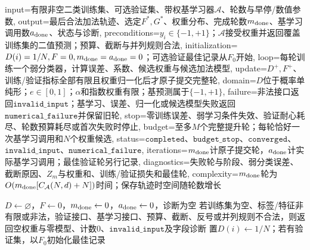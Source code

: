 \begin{AlgorithmContract}{
  input={有限非空二类训练集、可选验证集、带权基学习器$\mathcal A$、轮数与早停/数值参数},
  output={最后合法加法轨迹、选定$F^*,G^*$、权重分布、完成轮数$m_{\rm done}$、基学习调用数$a_{\rm done}$、状态与诊断},
  preconditions={$y_i\in\{-1,+1\}$；$\mathcal A$接受权重并返回覆盖训练集的二值预测；预算、截断与并列规则合法},
  initialization={$D(i)=1/N,F=0,m_{\rm done}=a_{\rm done}=0$；可选验证最佳记录从$F_0$开始},
  loop={每轮训练一个弱分类器，计算误差、系数、候选权重与候选加法模型},
  update={$D^+,F^+$、训练/验证指标全部有限且权重归一化后才原子提交完整轮},
  domain={$D$位于概率单纯形；$e\in[0,1]$；$\alpha$和指数权重有限；基预测属于$\{-1,+1\}$},
  failure={非法接口返回$\mathtt{invalid\_input}$；基学习、误差、归一化或候选模型失败返回$\mathtt{numerical\_failure}$并保留旧轮},
  stop={零训练误差、弱学习条件失效、验证耐心耗尽、轮数预算耗尽或首次失败时停止},
  budget={至多$M$个完整提升轮；每轮恰好一次基学习调用和$N$个权重候选},
  status={$\mathtt{completed}$、$\mathtt{budget\_stop}$、$\mathtt{converged}$、$\mathtt{invalid\_input}$、$\mathtt{numerical\_failure}$},
  iterations={$m_{\rm done}$计原子提交轮，$a_{\rm done}$计实际基学习调用；最佳验证轮另行记录},
  diagnostics={失败轮与阶段、弱分类误差、截断原因、$Z_m$与权重和、训练/验证损失和最佳轮},
  complexity={$m_{\rm done}$轮为$O(m_{\rm done}[C_{\mathcal A}(N,d)+N])$时间；保存轨迹时空间随轮数增长}
}
\begin{algorithm}[H]
\SLStudentTallAlgorithmFont
\caption{二类AdaBoost训练}\label{alg:V3-C03-adaboost}
$D\leftarrow\varnothing$，$F\leftarrow0$，$m_{\rm done}\leftarrow0$，$a_{\rm done}\leftarrow0$，诊断为空\;
若训练集为空、标签/特征非有限或非法，验证接口、基学习接口、预算、截断、反号或并列规则不合法，则返回空权重与零模型、计数$0$、$\mathtt{invalid\_input}$及字段诊断\;
置$D(i)\leftarrow1/N$；若有验证集，以$F_0$初始化最佳记录\;
\end{algorithm}
\end{AlgorithmContract}
